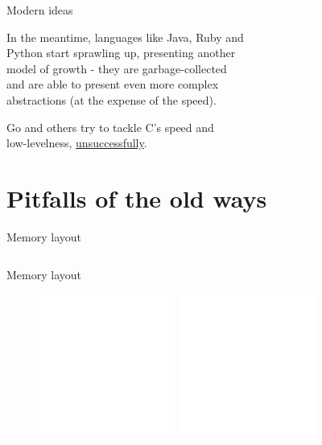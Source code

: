 \documentclass[usenames,dvipsnames,10pt,aspectratio=169]{beamer}
\begin{document}
\begin{frame}{Modern ideas}

\large
In the meantime, languages like Java, Ruby and\\
Python start sprawling up, presenting another\\
model of growth - they are garbage-collected\\
and are able to present even more complex\\
abstractions (at the expense of the speed).\\

\vspace{0.5cm}

Go and others try to tackle C's speed and\\
low-levelness, 
\href{https://cowlark.com/2009-11-15-go/}{unsuccessfully}.

\end{frame}


\section{Pitfalls of the old ways}

\begin{frame}{Memory layout} 
\inputminted[fontsize=\large]{c}{code/stack.c}
\end{frame}

\begin{frame}{Memory layout} 

\begin{figure}[ht]
	\includegraphics[width=0.4\textwidth]{graphics/stack1.png}
  \hfill
	\includegraphics[width=0.4\textwidth]{graphics/stack2.png}
	\hfill
\end{figure}
	
\end{frame}
\end{document}
